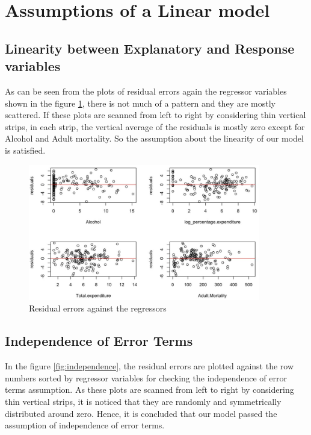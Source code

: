 \section{Assumptions of a Linear model}
\label{sec:assumptions}

\subsection{Linearity between Explanatory and Response variables}
\label{sec:linearity}
As can be seen from the plots of residual errors again the regressor variables shown in the figure \ref{fig:linearity}, there is not much of a pattern and they are mostly scattered. If these plots are scanned from left to right by considering thin vertical strips, in each strip, the vertical average of the residuals is mostly zero except for Alcohol and Adult mortality. So the assumption about the linearity of our model is satisfied. 

\begin{figure}
  \centering
  \includegraphics[width = 0.9\textwidth]{figures/linearity.PNG}
  \caption{Residual errors against the regressors}
  \label{fig:linearity}
\end{figure}

\subsection{Independence of Error Terms}
\label{sec:independence}
In the figure \ref{fig:independence}, the residual errors are plotted against the row numbers sorted by regressor variables for checking the independence of error terms assumption. As these plots are scanned from left to right by considering thin vertical strips, it is noticed that they are randomly and symmetrically distributed around zero. Hence, it is concluded that our model passed the assumption of independence of error terms. 

